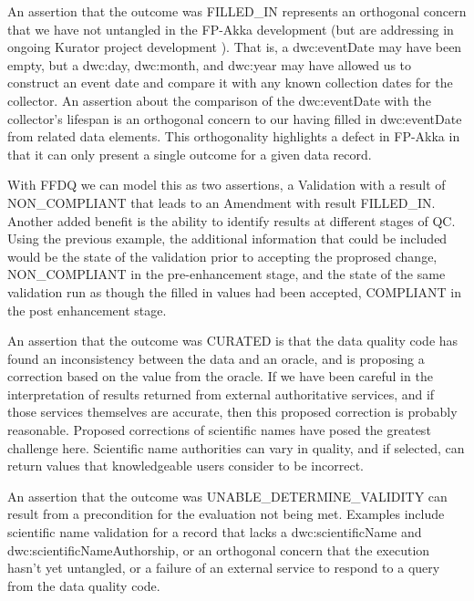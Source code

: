 \documentclass{article}
\begin{document}
An assertion that the outcome was FILLED\_IN represents an orthogonal concern that we have not untangled in the FP-Akka development (but are addressing in ongoing Kurator project development \citep{Kurator_wiki_2016}).  That is, a dwc:eventDate may have been empty, but a dwc:day, dwc:month, and dwc:year may have allowed us to construct an event date and compare it with any known collection dates for the collector.  An assertion about the comparison of the dwc:eventDate with the collector's lifespan is an orthogonal concern to our having filled in dwc:eventDate from related data elements.  This orthogonality highlights a defect in FP-Akka in that it can only present a single outcome for a given data record. 

With FFDQ we can model this as two assertions, a Validation with a result of NON\_COMPLIANT that leads to an Amendment with result FILLED\_IN. Another added benefit is the ability to identify results at different stages of QC. Using the previous example, the additional information that could be included would be the state of the validation prior to accepting the proprosed change, NON\_COMPLIANT in the pre-enhancement stage, and the state of the same validation run as though the filled in values had been accepted, COMPLIANT in the post enhancement stage.

An assertion that the outcome was CURATED is that the data quality code has found an inconsistency between the data and an oracle, and is proposing a correction based on the value from the oracle.  If we have been careful in the interpretation of results returned from external authoritative services, and if those services themselves are accurate, then this proposed correction is probably reasonable.  Proposed corrections of scientific names have posed the greatest challenge here.  Scientific name authorities can vary in quality, and if selected, can return values that knowledgeable users consider to be incorrect. 

An assertion that the outcome was UNABLE\_DETERMINE\_VALIDITY can result from a precondition for the evaluation not being met. 
Examples include scientific name validation for a record that lacks a dwc:scientificName and dwc:scientificNameAuthorship, or an orthogonal concern that the execution hasn't yet untangled, or a failure of an external service to respond to a query from the data quality code.
\end{document}
